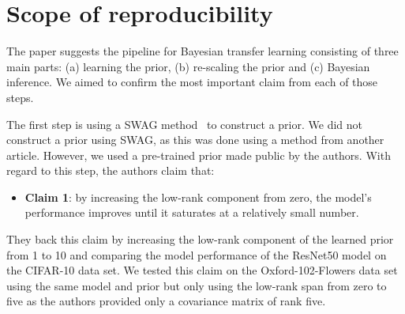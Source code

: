 \section{Scope of reproducibility}
\label{sec:claims}




The paper suggests the pipeline for Bayesian transfer learning consisting of three main parts: (a) learning the prior, (b) re-scaling the prior and (c) Bayesian inference. We aimed to confirm the most important claim from each of those steps.

The first step is using a SWAG method~\cite{https://doi.org/10.48550/arxiv.1902.02476} to construct a prior. We did not construct a prior using SWAG, as this was done using a method from another article. However, we used a pre-trained prior made public by the authors.
With regard to this step, the authors claim that:
\begin{itemize}
    \item \textbf{Claim 1}: by increasing the low-rank component from zero, the model's performance improves until it saturates at a relatively small number.
\end{itemize}
They back this claim by increasing the low-rank component of the learned prior from 1 to 10 and comparing the model performance of the ResNet50 model on the CIFAR-10 data set. We tested this claim on the Oxford-102-Flowers data set using the same model and prior but only using the low-rank span from zero to five as the authors provided only a covariance matrix of rank five.

